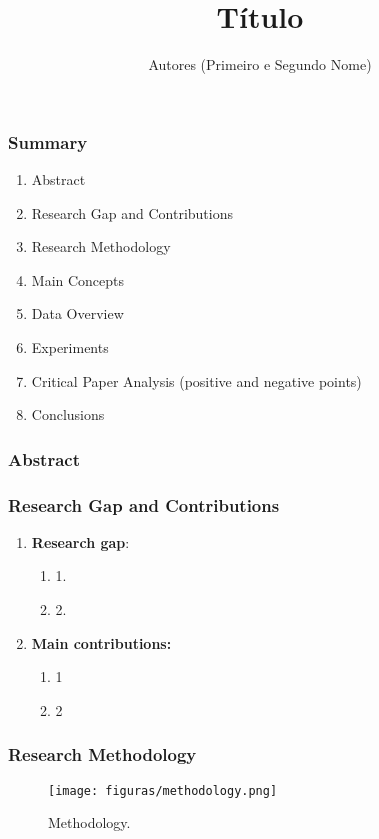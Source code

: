 \documentclass{beamer}
\title{\textbf{Título}}
\author{Autores (Primeiro e Segundo Nome)} \\\\\\ \institute[Universidade (Sigla)]
\begin{document}
\begin{frame}
\titlepage %
\end{frame}

\begin{frame}
\frametitle{Summary}
\begin{enumerate}
    \item Abstract
    \item Research Gap and Contributions
    \item Research Methodology
    \item Main Concepts
    \item Data Overview
    \item Experiments
    \item Critical Paper Analysis (positive and negative points)
    \item Conclusions
\end{enumerate}
\end{frame}



\begin{frame}
\frametitle{Abstract}

\end{frame}


\begin{frame}
\frametitle{Research Gap and Contributions}

\begin{enumerate}
    \item \textbf{Research gap}:
    \begin{enumerate}
        \item 1.
        \item 2.
    \end{enumerate}
    \item  \textbf{Main contributions:} 
    \begin{enumerate}
        \item 1
        \item 2
        \end{enumerate}
\end{enumerate}
\end{frame}

\begin{frame}
\frametitle{Research Methodology}
 \begin{figure}[!htb]
\centering  
\texttt{[image: figuras/methodology.png]}
\caption{Methodology.}
\end{figure}
\end{frame}
\end{document}

